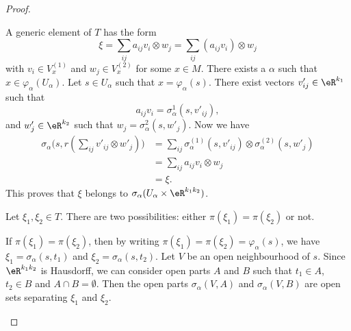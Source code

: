 \begin{proof}
\begin{subproof}
		A generic element of \( T\) has the form
		\begin{equation}
			\xi=\sum_{ij}a_{ij} v_i\otimes w_j=\sum_{ij} (a_{ij}v_i)\otimes w_j
		\end{equation}
		with \( v_i\in V_x^{(1)}\) and \( w_j\in V_x^{(2)}\) for some \( x\in M\). There exists a \( \alpha\) such that \( x\in \varphi_{\alpha}(U_{\alpha})\). Let \( s\in U_{\alpha}\) such that \( x=\varphi_{\alpha}(s)\). There exist vectors \( v'_{ij}\in \eR^{k_1}\) such that
		\begin{equation}
			a_{ij}v_i=\sigma_{\alpha}^{1}(s,v'_{ij}),
		\end{equation}
		and \( w'_j\in \eR^{k_2}\) such that \( w_j=\sigma_{\alpha}^{2}(s,w'_j)\). Now we have
		\begin{subequations}
			\begin{align}
				\sigma_{\alpha}\big( s,r(\sum_{ij}v'_{ij}\otimes w'_j) \big) & =\sum_{ij}\sigma_{\alpha}^{(1)}(s,v'_{ij})\otimes \sigma_{\alpha}^{(2)}(s,w'_j) \\
				                                                             & = \sum_{ij}a_{ij}v_i\otimes w_j                                                 \\
				                                                             & =\xi.
			\end{align}
		\end{subequations}
		This proves that \( \xi\) belongs to \( \sigma_{\alpha}(U_{\alpha}\times \eR^{k_1k_2})\).

		Let \( \xi_1,\xi_2\in T\). There are two possibilities: either \( \pi(\xi_1)=\pi(\xi_2)\) or not.

		If \( \pi(\xi_1)=\pi(\xi_2)\), then by writing \( \pi(\xi_1)=\pi(\xi_2)=\varphi_{\alpha}(s)\), we have \( \xi_1=\sigma_{\alpha}(s,t_1)\) and \( \xi_2=\sigma_{\alpha}(s,t_2)\). Let \( V\) be an open neighbourhood of \( s\). Since \( \eR^{k_1k_2}\) is Hausdorff, we can consider open parts \( A\) and \( B\) such that \( t_1\in A\), \( t_2\in B\) and \( A\cap B=\emptyset\). Then the open parts \( \sigma_{\alpha}(V,A)\) and \( \sigma_{\alpha}(V,B)\) are open sets separating \( \xi_1\) and \( \xi_2\).


\end{subproof}
\end{proof}
